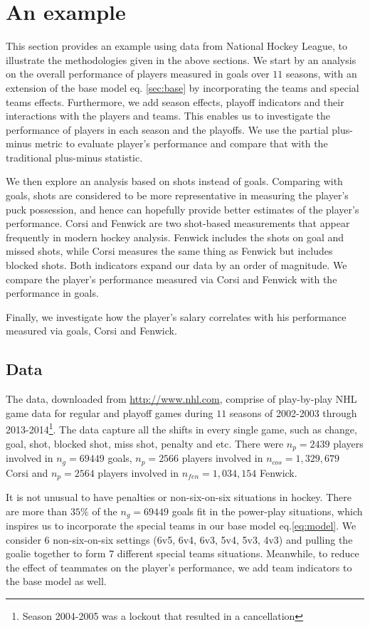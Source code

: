 \section{An example}
\label{sec:example}
This section provides an example using data from National Hockey League, to illustrate the methodologies given in the above sections. We start by an analysis on the overall performance of players measured in goals over $11$ seasons, with an extension of the base model eq. \eqref{sec:base} by incorporating the teams and special teams effects. Furthermore, we add season effects, playoff indicators and their interactions with the players and teams. This enables us to investigate the performance of players in each season and the playoffs. We use the partial plus-minus metric to evaluate player's performance and compare that with the traditional plus-minus statistic.

We then explore an analysis based on shots instead of goals. Comparing with goals, shots are considered to be more representative in measuring the player's puck possession, and hence can hopefully provide better estimates of the player's performance. Corsi and Fenwick are two shot-based measurements that appear frequently in modern hockey analysis. Fenwick includes the shots on goal and missed shots, while Corsi measures the same thing as Fenwick but includes blocked shots. Both indicators expand our data by an order of magnitude. We compare the player's performance measured via Corsi and Fenwick with the performance in goals.

Finally, we investigate how the player's salary correlates with his performance measured via goals, Corsi and Fenwick.

\subsection{Data}
The data, downloaded from \url{http://www.nhl.com}, comprise of play-by-play NHL game data for regular and playoff games during $11$ seasons of 2002-2003 through 2013-2014\footnote{Season 2004-2005 was a lockout that resulted in a cancellation}. The data capture all the shifts in every single game, such as change, goal, shot, blocked shot, miss shot, penalty and etc. There were $n_p=2439$ players involved in $n_g=69449$ goals, $n_p=2566$ players involved in $n_{cos}=1,329,679$ Corsi and $n_p=2564$ players involved in $n_{fen}=1,034,154$ Fenwick.

It is not unusual to have penalties or non-six-on-six situations in hockey. There are more than $35\%$ of the $n_g=69449$ goals fit in the power-play situations, which inspires us to incorporate the special teams in our base model eq.\eqref{eq:model}. We consider $6$ non-six-on-six settings (6v5, 6v4, 6v3, 5v4, 5v3, 4v3) and pulling the goalie together to form $7$ different special teams situations. Meanwhile, to reduce the effect of teammates on the player's performance, we add team indicators to the base model as well.

